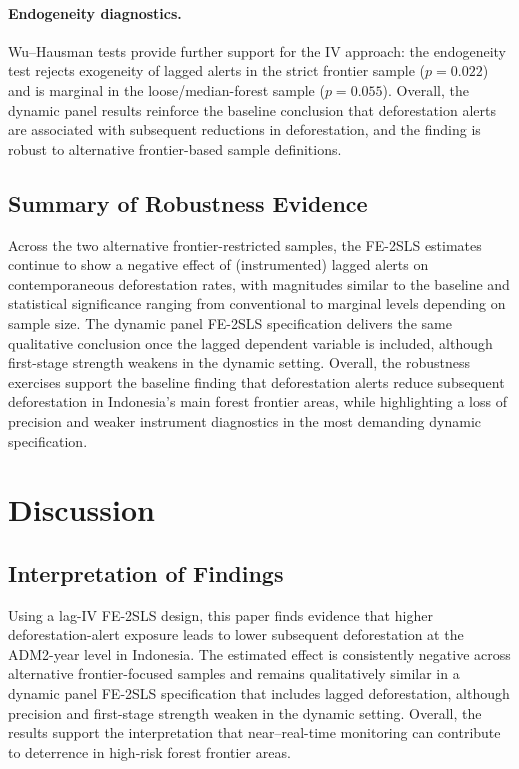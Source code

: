 \documentclass[hidelinks,12pt]{article}
\begin{document}
\paragraph{Endogeneity diagnostics.}
Wu--Hausman tests provide further support for the IV approach: the endogeneity test rejects exogeneity of lagged alerts in the strict frontier sample ($p=0.022$) and is marginal in the loose/median-forest sample ($p=0.055$). Overall, the dynamic panel results reinforce the baseline conclusion that deforestation alerts are associated with subsequent reductions in deforestation, and the finding is robust to alternative frontier-based sample definitions.


\subsection{Summary of Robustness Evidence}
\label{sec:robust_summary}

Across the two alternative frontier-restricted samples, the FE-2SLS estimates continue to show a negative effect of (instrumented) lagged alerts on contemporaneous deforestation rates, with magnitudes similar to the baseline and statistical significance ranging from conventional to marginal levels depending on sample size. The dynamic panel FE-2SLS specification delivers the same qualitative conclusion once the lagged dependent variable is included, although first-stage strength weakens in the dynamic setting. Overall, the robustness exercises support the baseline finding that deforestation alerts reduce subsequent deforestation in Indonesia's main forest frontier areas, while highlighting a loss of precision and weaker instrument diagnostics in the most demanding dynamic specification.


\section{Discussion} \label{Discussion}
\subsection{Interpretation of Findings}
\label{sec:discussion_interpretation_short}

Using a lag-IV FE-2SLS design, this paper finds evidence that higher deforestation-alert exposure leads to lower subsequent deforestation at the ADM2-year level in Indonesia. The estimated effect is consistently negative across alternative frontier-focused samples and remains qualitatively similar in a dynamic panel FE-2SLS specification that includes lagged deforestation, although precision and first-stage strength weaken in the dynamic setting. Overall, the results support the interpretation that near--real-time monitoring can contribute to deterrence in high-risk forest frontier areas.
\end{document}
